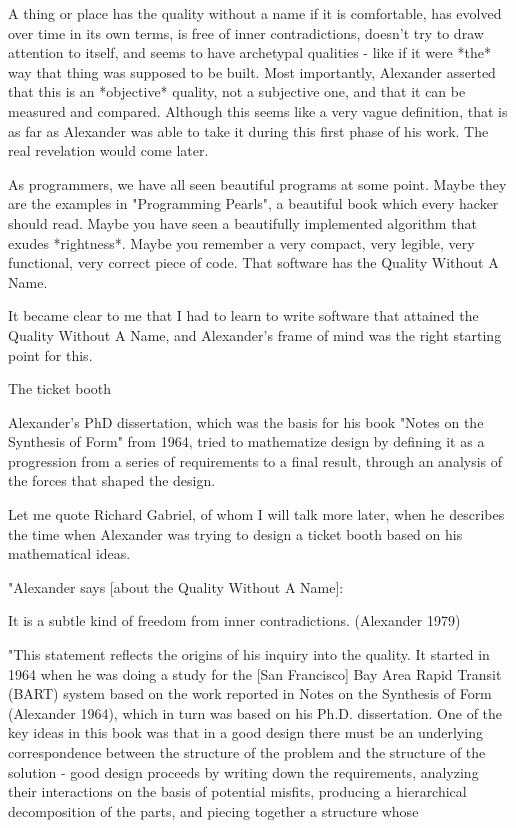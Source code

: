 A thing or place has the quality without a name if it is comfortable, has evolved over time in its own terms, is free of inner contradictions, doesn't try to draw attention to itself, and seems to have archetypal qualities - like if it were *the* way that thing was supposed to be built.  Most importantly, Alexander asserted that this is an *objective* quality, not a subjective one, and that it can be measured and compared.  Although this seems like a very vague definition, that is as far as Alexander was able to take it during this first phase of his work.  The real revelation would come later.

As programmers, we have all seen beautiful programs at some point. Maybe they are the examples in "Programming Pearls", a beautiful book which every hacker should read.  Maybe you have seen a beautifully implemented algorithm that exudes *rightness*.  Maybe you remember a very compact, very legible, very functional, very correct piece of code.  That software has the Quality Without A Name.

It became clear to me that I had to learn to write software that attained the Quality Without A Name, and Alexander's frame of mind was the right starting point for this.

The ticket booth

Alexander's PhD dissertation, which was the basis for his book "Notes on the Synthesis of Form" from 1964, tried to mathematize design by defining it as a progression from a series of requirements to a final result, through an analysis of the forces that shaped the design.

Let me quote Richard Gabriel, of whom I will talk more later, when he describes the time when Alexander was trying to design a ticket booth based on his mathematical ideas.

"Alexander says [about the Quality Without A Name]:

	It is a subtle kind of freedom from inner contradictions. (Alexander 1979)

"This statement reflects the origins of his inquiry into the quality. It started in 1964 when he was doing a study for the [San Francisco] Bay Area Rapid Transit (BART) system based on the work reported in Notes on the Synthesis of Form (Alexander 1964), which in turn was based on his Ph.D. dissertation. One of the key ideas in this book was that in a good design there must be an underlying correspondence between the structure of the problem and the structure of the solution - good design proceeds by writing down the requirements, analyzing their interactions on the basis of potential misfits, producing a hierarchical decomposition of the parts, and piecing together a structure whose

